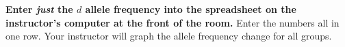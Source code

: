 \documentclass[12pt, hidelinks]{exam}
\newcommand{\allele}[1]{$#1$}
\begin{document}
\begin{questions}
%
%

\question
\textbf{Enter \emph{just} the \allele{d} allele frequency into the spreadsheet on the instructor's
computer at the front of the room.}  Enter the numbers all 
in one row. Your instructor will graph the allele frequency change for all groups.


\end{questions}
\end{document}
